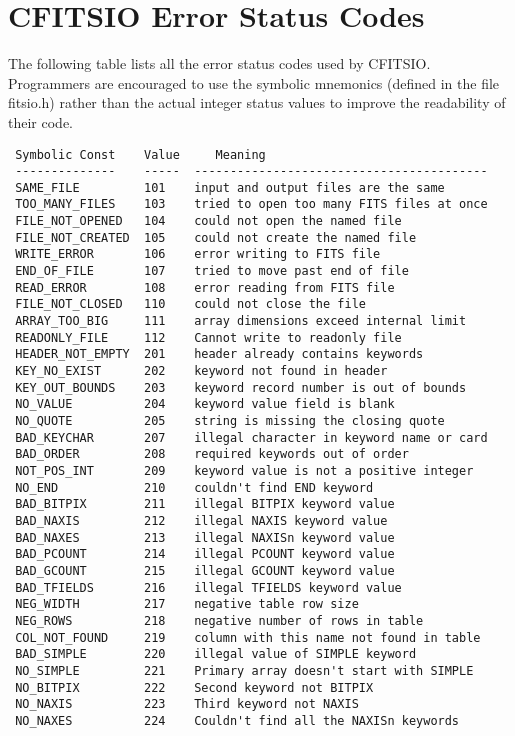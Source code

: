 \chapter{ CFITSIO Error Status Codes }

The following table lists all the error status codes used by CFITSIO.
Programmers are encouraged to use the symbolic mnemonics (defined in
the file fitsio.h) rather than the actual integer status values to
improve the readability of their code.

\begin{verbatim}
 Symbolic Const    Value     Meaning
 --------------    -----  -----------------------------------------
 SAME_FILE         101    input and output files are the same
 TOO_MANY_FILES    103    tried to open too many FITS files at once
 FILE_NOT_OPENED   104    could not open the named file
 FILE_NOT_CREATED  105    could not create the named file
 WRITE_ERROR       106    error writing to FITS file
 END_OF_FILE       107    tried to move past end of file
 READ_ERROR        108    error reading from FITS file
 FILE_NOT_CLOSED   110    could not close the file
 ARRAY_TOO_BIG     111    array dimensions exceed internal limit
 READONLY_FILE     112    Cannot write to readonly file
 HEADER_NOT_EMPTY  201    header already contains keywords
 KEY_NO_EXIST      202    keyword not found in header
 KEY_OUT_BOUNDS    203    keyword record number is out of bounds
 NO_VALUE          204    keyword value field is blank
 NO_QUOTE          205    string is missing the closing quote
 BAD_KEYCHAR       207    illegal character in keyword name or card
 BAD_ORDER         208    required keywords out of order
 NOT_POS_INT       209    keyword value is not a positive integer
 NO_END            210    couldn't find END keyword
 BAD_BITPIX        211    illegal BITPIX keyword value
 BAD_NAXIS         212    illegal NAXIS keyword value
 BAD_NAXES         213    illegal NAXISn keyword value
 BAD_PCOUNT        214    illegal PCOUNT keyword value
 BAD_GCOUNT        215    illegal GCOUNT keyword value
 BAD_TFIELDS       216    illegal TFIELDS keyword value
 NEG_WIDTH         217    negative table row size
 NEG_ROWS          218    negative number of rows in table
 COL_NOT_FOUND     219    column with this name not found in table
 BAD_SIMPLE        220    illegal value of SIMPLE keyword
 NO_SIMPLE         221    Primary array doesn't start with SIMPLE
 NO_BITPIX         222    Second keyword not BITPIX
 NO_NAXIS          223    Third keyword not NAXIS
 NO_NAXES          224    Couldn't find all the NAXISn keywords

\end{verbatim}
